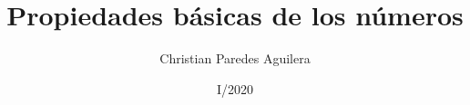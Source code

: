 \normalfont

\author{Christian Paredes Aguilera}
\title{Propiedades básicas de los números}
\date{I/2020}
\maketitle
\let\cleardoublepage\clearpage
\tableofcontents 								%

 
\let\cleardoublepage\clearpage